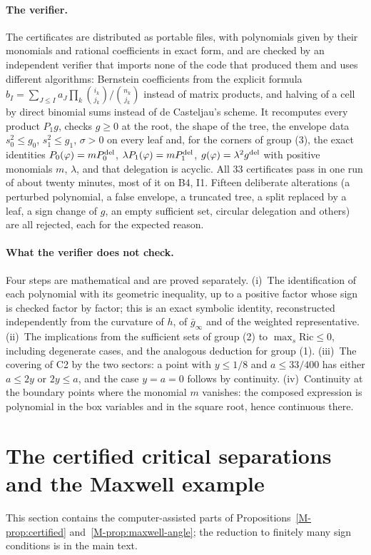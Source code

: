 \documentclass[aip,jmp,amsmath,amssymb,reprint]{revtex4-2}
\theoremstyle{plain}
\theoremstyle{definition}
\begin{document}
\paragraph{The verifier.} The certificates are distributed as portable files, with polynomials given by
their monomials and rational coefficients in exact form, and are checked by an independent verifier that
imports none of the code that produced them and uses different algorithms: Bernstein coefficients from the
explicit formula $b_I=\sum_{J\le I}a_J\prod_k\binom{i_k}{j_k}/\binom{n_k}{j_k}$ instead of matrix products, and halving
of a cell by direct binomial sums instead of de Casteljau's scheme. It recomputes every product $P_1g$,
checks $g\ge0$ at the root, the shape of the tree, the envelope data $s_0^2\le g_0$, $s_1^2\le g_1$, $\sigma>0$ on
every leaf and, for the corners of group (3), the exact identities $P_0(\varphi)=mP_0^{\rm del}$,
$\lambda P_1(\varphi)=mP_1^{\rm del}$, $g(\varphi)=\lambda^2g^{\rm del}$ with positive monomials $m$, $\lambda$, and that delegation
is acyclic. All $33$ certificates pass in one run of about twenty minutes, most of it on B4, I1. Fifteen
deliberate alterations (a perturbed polynomial, a false envelope, a truncated tree, a split replaced by a
leaf, a sign change of $g$, an empty sufficient set, circular delegation and others) are all rejected,
each for the expected reason.

\paragraph{What the verifier does not check.} Four steps are mathematical and are proved separately.
(i)~The identification of each polynomial with its geometric inequality, up to a positive factor whose
sign is checked factor by factor; this is an exact symbolic identity, reconstructed independently from
the curvature of $h$, of $\bar g_\infty$ and of the weighted representative. (ii)~The implications from the
sufficient sets of group (2) to $\max_s\mathrm{Ric}\le0$, including degenerate cases, and the analogous
deduction for group (1). (iii)~The covering of C2 by the two sectors: a point with $y\le1/8$ and
$a\le33/400$ has either $a\le2y$ or $2y\le a$, and the case $y=a=0$ follows by continuity. (iv)~Continuity at
the boundary points where the monomial $m$ vanishes: the composed expression is polynomial in the box
variables and in the square root, hence continuous there.

\section{The certified critical separations and the Maxwell example}
\label{sec:supp-tau-cert}
This section contains the computer-assisted parts of Propositions~\ref{M-prop:certified}
and~\ref{M-prop:maxwell-angle}; the reduction to finitely many sign conditions is in the main text.
\end{document}
